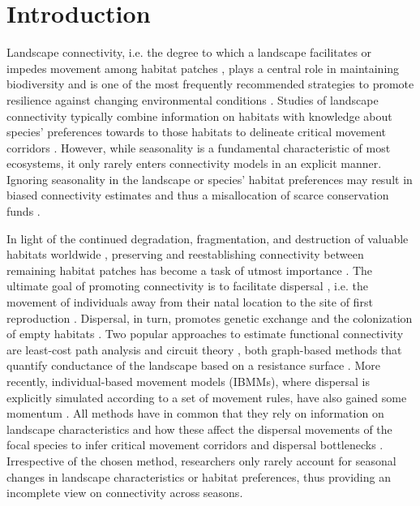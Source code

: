 \documentclass[abstract=on,10pt,a4paper,bibliography=totocnumbered]{article}
\begin{document}
\newpage

\onehalfspacing
\tableofcontents
\doublespacing

\newpage
{}

\section{Introduction}
Landscape connectivity, i.e. the degree to which a landscape facilitates or
impedes movement among habitat patches \citep{Taylor.1993}, plays a central role
in maintaining biodiversity \citep{Fahrig.2003} and is one of the most
frequently recommended strategies to promote resilience against changing
environmental conditions \citep{Rudnick.2012}. Studies of landscape connectivity
typically combine information on habitats with knowledge about species'
preferences towards to those habitats to delineate critical movement corridors
\citep{Beier.2008, Diniz.2019}. However, while seasonality is a fundamental
characteristic of most ecosystems, it only rarely enters connectivity models in
an explicit manner. Ignoring seasonality in the landscape or species' habitat
preferences may result in biased connectivity estimates and thus a misallocation
of scarce conservation funds \citep{Osipova.2019, Zeller.2020}.

In light of the continued degradation, fragmentation, and destruction of
valuable habitats worldwide \citep{Fahrig.2003, Haddad.2015}, preserving and
reestablishing connectivity between remaining habitat patches has become a task
of utmost importance \citep{Heller.2009, Rudnick.2012}. The ultimate goal of
promoting connectivity is to facilitate dispersal \citep{Doerr.2011,
Baguette.2013}, i.e. the movement of individuals away from their natal location
to the site of first reproduction \citep{Clobert.2012}. Dispersal, in turn,
promotes genetic exchange \citep{Perrin.2000, Frankham.2002} and the
colonization of empty habitats \citep{Hanski.1999, MacArthur.2001}. Two popular
approaches to estimate functional connectivity are least-cost path analysis
\citep{Adriaensen.2003} and circuit theory \citep{McRae.2008}, both graph-based
methods that quantify conductance of the landscape based on a resistance surface
\citep{Zeller.2012, Diniz.2019}. More recently, individual-based movement models
(IBMMs), where dispersal is explicitly simulated according to a set of movement
rules, have also gained some momentum \citep{Kanagaraj.2013, Allen.2016,
Hauenstein.2019, Diniz.2019, Zeller.2020, UnnithanKumar.2022a,
UnnithanKumar.2022, Hofmann.2023}. All methods have in common that they rely on
information on landscape characteristics and how these affect the dispersal
movements of the focal species to infer critical movement corridors and
dispersal bottlenecks \citep{Diniz.2019}. Irrespective of the chosen method,
researchers only rarely account for seasonal changes in landscape
characteristics or habitat preferences, thus providing an incomplete view on
connectivity across seasons.
\end{document}
